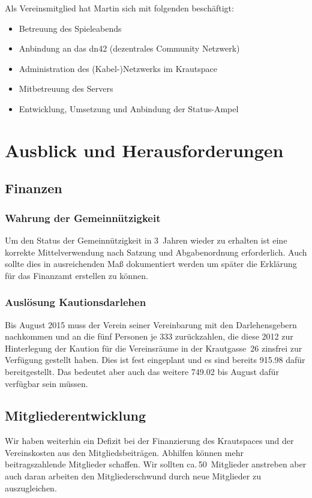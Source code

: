 \documentclass[ngerman]{scrartcl}
\begin{document}
Als Vereinsmitglied hat Martin sich mit folgenden beschäftigt: 
\begin{itemize}
	\item Betreuung des Spieleabends
	\item Anbindung an das dn42 (dezentrales Community Netzwerk)
	\item Administration des (Kabel-)Netzwerks im Krautspace
	\item Mitbetreuung des Servers
	\item Entwicklung, Umsetzung und Anbindung der Status-Ampel
\end{itemize}

\section{Ausblick und Herausforderungen}

\subsection{Finanzen}
\label{sec:ausblick:finanzen}

\subsubsection{Wahrung der Gemeinnützigkeit}
Um den Status der Gemeinnützigkeit in 3~Jahren wieder zu erhalten ist eine korrekte Mittelverwendung nach Satzung und Abgabenordnung erforderlich.
Auch sollte dies in ausreichenden Maß dokumentiert werden um später die Erklärung für das Finanzamt erstellen zu können.

\subsubsection{Auslösung Kautionsdarlehen}
\label{sec:katrionsdarlehen}
Bis August 2015 muss der Verein seiner Vereinbarung mit den Darlehensgebern nachkommen und an die fünf Personen je \SI{333}{\EUR} zurückzahlen, die diese 2012 zur Hinterlegung der Kaution für die Vereinsräume in der Krautgasse~26 zinsfrei zur Verfügung gestellt haben.
Dies ist fest eingeplant und es sind bereits \SI{915,98}{\EUR} dafür bereitgestellt.
Das bedeutet aber auch das weitere \SI{749,02}{\EUR} bis August dafür verfügbar sein müssen.

\subsection{Mitgliederentwicklung}
Wir haben weiterhin ein Defizit bei der Finanzierung des Krautspaces und der Vereinskosten aus den Mitgliedsbeiträgen.
Abhilfen können mehr beitragszahlende Mitglieder schaffen.
Wir sollten ca.\,50~Mitglieder anstreben aber auch daran arbeiten den Mitgliederschwund durch neue Mitglieder zu auszugleichen.
\end{document}
